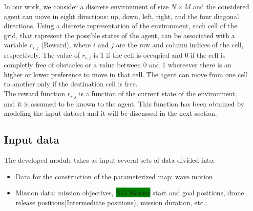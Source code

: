 \documentclass[journal,article,submit,pdftex,moreauthors]{Definitions/mdpi}
\begin{document}

In our work, we consider a discrete environment of size $N\times M$ and the considered agent can move in eight directions: up, down, left, right, and the four diagonal directions.
Using a discrete representation of the environment, each cell of the grid, that rapresent the possible states of the agent, can be associated with a variable $r_{i,j}$ (Reward), 
where $i$ and $j$ are the row and column indices of the cell, respectively. The value of $r_{i,j}$ is 1 if the cell is occupied and 0 if the cell is completly free of obstacles or 
a value between 0 and 1 whereever there is an higher or lower preference to move in that cell. The agent can move from one cell to another only if the destination cell is free.\\

The reward function $r_{i,j}$ is a function of the current state of the environment, and it is assumed to be known to the agent. 
This function has been obtained by modeling the input dataset and it will be discussed in the next section.\\

\subsection{Input data}
The developed module takes as input several sets of data divided into:
\begin{itemize}
\item Data for the construction of the parameterized map: wave motion 
\item Mission data: mission objectives, \colorbox{green}{NG Worker} start and goal positions, drone release positions(Intermediate positions), 
	mission duration, etc.;
\end{itemize}
\end{document}
